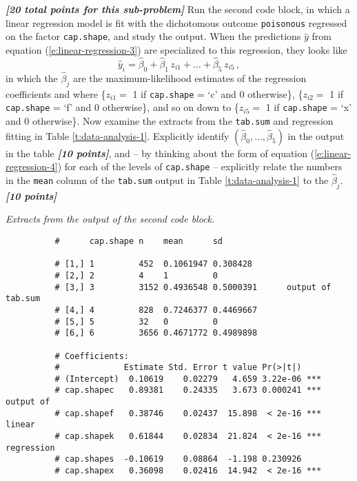 \documentclass[12pt]{article}
\newcommand{\bi}[1]{\b{\i{#1}}}
\renewcommand{\b}[1]{\textbf{#1}}
\renewcommand{\i}[1]{\textit{#1}}
\begin{document}
\begin{itemize}
\bi{[20 total points for this sub-problem]} Run the second code block, in which a linear regression model is fit with the dichotomous outcome \texttt{poisonous} regressed on the factor \texttt{cap.shape}, and study the output. When the predictions $\hat{ y }$ from equation (\ref{e:linear-regression-3}) are specialized to this regression, they looks like
\begin{equation} \label{e:linear-regression-4}
\hat{ y }_i = \hat{ \beta }_0 + \hat{ \beta }_1 \, z_{ i1 } + \dots + \hat{ \beta }_5 \, z_{ i5 } \, ,
\end{equation} 
in which the $\hat{ \beta }_j$ are the maximum-likelihood estimates of the regression coefficients and where \{$z_{ i1 } =$ 1 if \texttt{cap.shape} = `c' and 0 otherwise\}, \{$z_{ i2 } =$ 1 if \texttt{cap.shape} = `f' and 0 otherwise\}, and so on down to \{$z_{ i5 } =$ 1 if \texttt{cap.shape} = `x' and 0 otherwise\}. Now examine the extracts from the \texttt{tab.sum} and regression fitting in Table \ref{t:data-analysis-1}. Explicitly identify $( \hat{ \beta }_0, \dots, \hat{ \beta }_5 )$ in the output in the table \bi{[10 points]}, and -- by thinking about the form of equation (\ref{e:linear-regression-4}) for each of the levels of \texttt{cap.shape} -- explicitly relate the numbers in the \texttt{mean} column of the \texttt{tab.sum} output in Table \ref{t:data-analysis-1} to the $\hat{ \beta }_j$. \bi{[10 points]}

\begin{table}[t!]

\centering

\caption{\textit{Extracts from the output of the second code block.}}

\begin{verbatim}
          #      cap.shape n    mean      sd       

          # [1,] 1         452  0.1061947 0.308428 
          # [2,] 2         4    1         0        
          # [3,] 3         3152 0.4936548 0.5000391      output of tab.sum
          # [4,] 4         828  0.7246377 0.4469667
          # [5,] 5         32   0         0        
          # [6,] 6         3656 0.4671772 0.4989898

          # Coefficients:
          #             Estimate Std. Error t value Pr(>|t|)    
          # (Intercept)  0.10619    0.02279   4.659 3.22e-06 ***
          # cap.shapec   0.89381    0.24335   3.673 0.000241 ***   output of
          # cap.shapef   0.38746    0.02437  15.898  < 2e-16 ***   linear
          # cap.shapek   0.61844    0.02834  21.824  < 2e-16 ***   regression
          # cap.shapes  -0.10619    0.08864  -1.198 0.230926    
          # cap.shapex   0.36098    0.02416  14.942  < 2e-16 ***
\end{verbatim}


\end{table}
\end{itemize}
\end{document}
